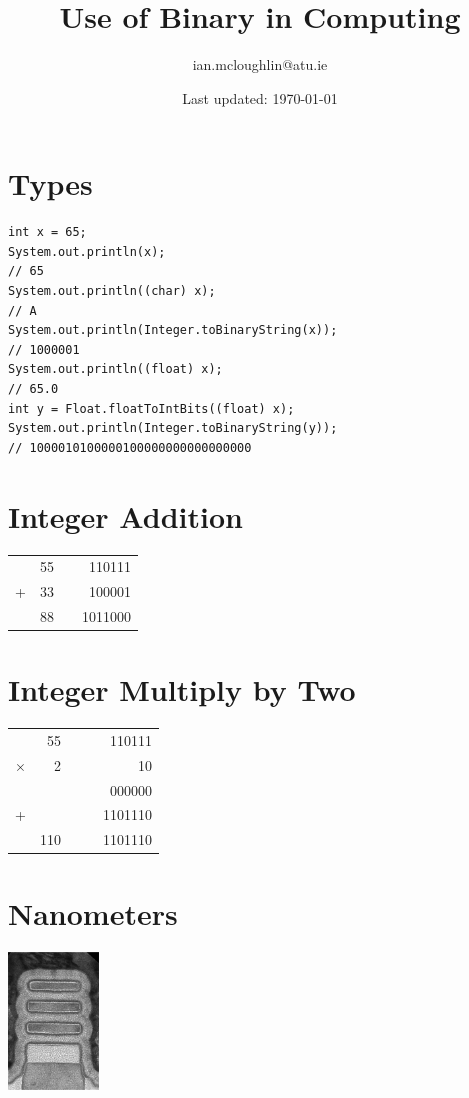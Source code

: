 \documentclass{iansnotes}
\title{Use of Binary in Computing}
\author{ian.mcloughlin@atu.ie}
\date{Last updated: \today}
\begin{document}
 
\maketitle

\section{Types}

\begin{verbatim}
int x = 65;
System.out.println(x);
// 65
System.out.println((char) x);
// A
System.out.println(Integer.toBinaryString(x));
// 1000001
System.out.println((float) x);
// 65.0
int y = Float.floatToIntBits((float) x);
System.out.println(Integer.toBinaryString(y));
// 1000010100000100000000000000000 
\end{verbatim}



\section{Integer Addition}

\begin{tabular}{rrrr}
    & 55 &   &  110111 \\
  + & 33 &   &  100001 \\
  \midrule
    & 88 &   & 1011000 \\
\end{tabular}

\section{Integer Multiply by Two}

\begin{tabular}{rrrrr}
           &  55 & &   &  110111 \\
  $\times$ &   2 & &   &      10 \\
  \midrule
           &     & &   &  000000 \\
  +        &     & &   & 1101110 \\
  \midrule
           & 110 & &   & 1101110 \\
\end{tabular}

\section{Nanometers}
\includegraphics[width=24mm]{img/ibm2nm.png}
\end{document}

